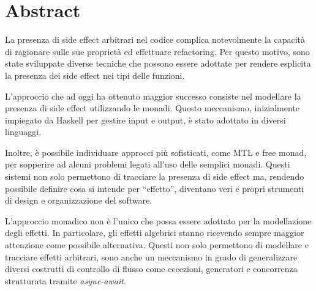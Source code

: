 \chapter*{Abstract}

La presenza di side effect arbitrari nel codice complica notevolmente la capacità di ragionare sulle sue proprietà ed effettuare refactoring.
Per questo motivo, sono state sviluppate diverse tecniche che possono essere adottate per rendere esplicita la presenza dei side effect nei tipi delle funzioni.

L'approccio che ad oggi ha ottenuto maggior successo consiste nel modellare la presenza di side effect utilizzando le monadi.
Questo meccanismo, inizialmente impiegato da Haskell per gestire input e output, è stato adottato in diversi linguaggi.

Inoltre, è possibile individuare approcci più sofisticati, come MTL e free monad, per sopperire ad alcuni problemi legati all'uso delle semplici monadi.
Questi sistemi non solo permettono di tracciare la presenza di side effect ma, rendendo possibile definire cosa si intende per ``effetto'', diventano veri e propri strumenti di design e organizzazione del software.

L'approccio monadico non è l'unico che possa essere adottato per la modellazione degli effetti. In particolare, gli effetti algebrici stanno ricevendo sempre maggior attenzione come possibile alternativa.
Questi non solo permettono di modellare e tracciare effetti arbitrari, sono anche un meccanismo in grado di generalizzare diversi costrutti di controllo di flusso come eccezioni, generatori e concorrenza strutturata tramite \emph{async-await}.
